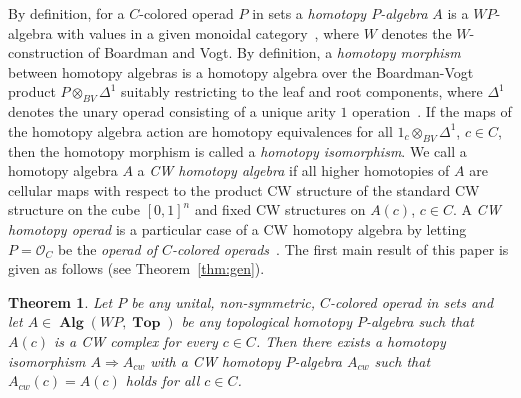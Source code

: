 \documentclass{amsart}
\newcounter{thmMaincounter}
\newtheorem{theoremM}[thmMaincounter]{Theorem}
\theoremstyle{definition}
\theoremstyle{remark}
\DeclareMathOperator{\Top}{\mathbf{Top}}
\DeclareMathOperator{\Alg}{\mathbf{Alg}}
\begin{document}
	By definition, for a $C$-colored operad $P$ in sets a \textit{homotopy $P$-algebra} $A$ is a $WP$-algebra with values in a given monoidal category~\cite{we-07}, where $W$ denotes the $W$-construction of Boardman and Vogt.
	By definition, a \textit{homotopy morphism} between homotopy algebras is a homotopy algebra over the Boardman-Vogt product $P\otimes_{BV} \Delta^{1}$ suitably restricting to the leaf and root components, where $\Delta^{1}$ denotes the unary operad consisting of a unique arity $1$ operation~\cite{we-07}.
	If the maps of the homotopy algebra action are homotopy equivalences for all $1_{c}\otimes_{BV}\Delta^{1}$, $c\in C$, then the homotopy morphism is called a \textit{homotopy isomorphism}.
	We call a homotopy algebra $A$ a \textit{CW homotopy algebra} if all higher homotopies of $A$ are cellular maps with respect to the product CW structure of the standard CW structure on the cube $[0,1]^{n}$ and fixed CW structures on $A(c)$, $c\in C$.
	A \textit{CW homotopy operad} is a particular case of a CW homotopy algebra by letting $P=\mathcal{O}_{C}$ be the \textit{operad of $C$-colored operads}~\cite[\S 1.5.6, \S 1.5.7]{be-mo-06}.
	The first main result of this paper is given as follows (see Theorem~\ref{thm:gen}).
	

	\begin{theoremM}\label{thmm:cwapp}
		Let $P$ be any unital, non-symmetric, $C$-colored operad in sets and let $A\in \Alg(WP,\Top)$ be any topological homotopy $P$-algebra such that $A(c)$ is a CW complex for every $c\in C$.
		Then there exists a homotopy isomorphism $A\Rightarrow A_{cw}$ with a CW homotopy $P$-algebra $A_{cw}$ such that $A_{cw}(c)=A(c)$ holds for all $c\in C$.
	\end{theoremM}
\end{document}
